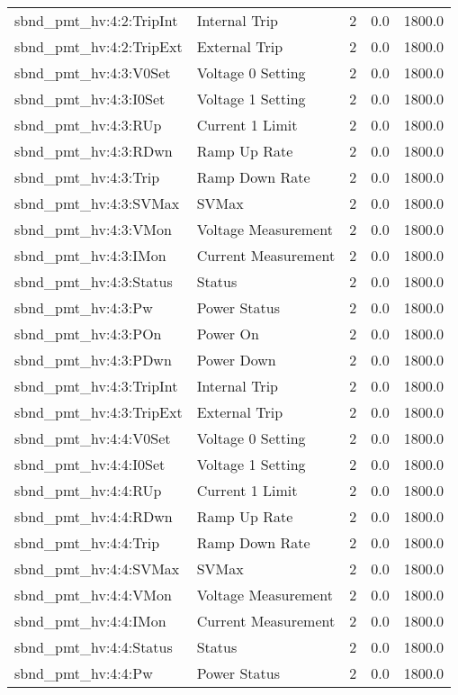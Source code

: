 \begin{center}
\begin{longtable}{l | l l l l }
sbnd\_pmt\_hv:4:2:TripInt & Internal Trip & 2 & 0.0 & 1800.0\\ 
sbnd\_pmt\_hv:4:2:TripExt & External Trip & 2 & 0.0 & 1800.0\\ 
sbnd\_pmt\_hv:4:3:V0Set & Voltage 0 Setting & 2 & 0.0 & 1800.0\\ 
sbnd\_pmt\_hv:4:3:I0Set & Voltage 1 Setting & 2 & 0.0 & 1800.0\\ 
sbnd\_pmt\_hv:4:3:RUp & Current 1 Limit & 2 & 0.0 & 1800.0\\ 
sbnd\_pmt\_hv:4:3:RDwn & Ramp Up Rate & 2 & 0.0 & 1800.0\\ 
sbnd\_pmt\_hv:4:3:Trip & Ramp Down Rate & 2 & 0.0 & 1800.0\\ 
sbnd\_pmt\_hv:4:3:SVMax & SVMax & 2 & 0.0 & 1800.0\\ 
sbnd\_pmt\_hv:4:3:VMon & Voltage Measurement & 2 & 0.0 & 1800.0\\ 
sbnd\_pmt\_hv:4:3:IMon & Current Measurement & 2 & 0.0 & 1800.0\\ 
sbnd\_pmt\_hv:4:3:Status & Status & 2 & 0.0 & 1800.0\\ 
sbnd\_pmt\_hv:4:3:Pw & Power Status & 2 & 0.0 & 1800.0\\ 
sbnd\_pmt\_hv:4:3:POn & Power On & 2 & 0.0 & 1800.0\\ 
sbnd\_pmt\_hv:4:3:PDwn & Power Down & 2 & 0.0 & 1800.0\\ 
sbnd\_pmt\_hv:4:3:TripInt & Internal Trip & 2 & 0.0 & 1800.0\\ 
sbnd\_pmt\_hv:4:3:TripExt & External Trip & 2 & 0.0 & 1800.0\\ 
sbnd\_pmt\_hv:4:4:V0Set & Voltage 0 Setting & 2 & 0.0 & 1800.0\\ 
sbnd\_pmt\_hv:4:4:I0Set & Voltage 1 Setting & 2 & 0.0 & 1800.0\\ 
sbnd\_pmt\_hv:4:4:RUp & Current 1 Limit & 2 & 0.0 & 1800.0\\ 
sbnd\_pmt\_hv:4:4:RDwn & Ramp Up Rate & 2 & 0.0 & 1800.0\\ 
sbnd\_pmt\_hv:4:4:Trip & Ramp Down Rate & 2 & 0.0 & 1800.0\\ 
sbnd\_pmt\_hv:4:4:SVMax & SVMax & 2 & 0.0 & 1800.0\\ 
sbnd\_pmt\_hv:4:4:VMon & Voltage Measurement & 2 & 0.0 & 1800.0\\ 
sbnd\_pmt\_hv:4:4:IMon & Current Measurement & 2 & 0.0 & 1800.0\\ 
sbnd\_pmt\_hv:4:4:Status & Status & 2 & 0.0 & 1800.0\\ 
sbnd\_pmt\_hv:4:4:Pw & Power Status & 2 & 0.0 & 1800.0\\ 

\end{longtable}
\end{center}
